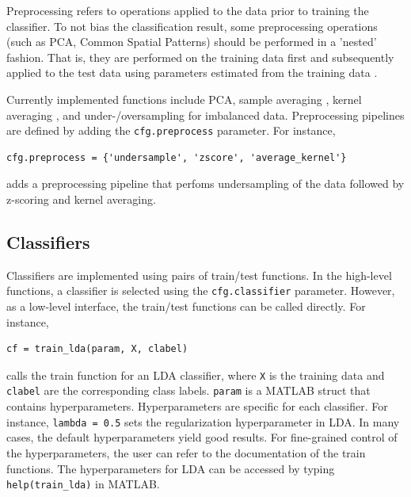 \documentclass[utf8]{frontiersSCNS} %
\newcommand{\ttt}[1]{\texttt{#1}}
\begin{document}
Preprocessing refers to operations applied to the data prior to training the classifier. To not bias the classification result, some preprocessing operations (such as PCA, Common Spatial Patterns) should be performed in a 'nested' fashion. That is, they are performed on the training data first and subsequently applied to the test data using parameters estimated from the training data \citep{Lemm2011}. 

Currently implemented functions include PCA, sample averaging \citep{Cichy2017MultivariateSpace}, kernel averaging \citep{Treder2018}, and under-/oversampling for imbalanced data. Preprocessing pipelines are defined by adding the \ttt{cfg.preprocess} parameter. For instance,

\begin{verbatim}
cfg.preprocess = {'undersample', 'zscore', 'average_kernel'}
\end{verbatim}

adds a preprocessing pipeline that perfoms undersampling of the data followed by z-scoring and kernel averaging.

\subsection{Classifiers}\label{sec:classifiers}

Classifiers are implemented using pairs of train/test functions. In the high-level functions, a classifier is selected using the \ttt{cfg.classifier} parameter. However, as a low-level interface, the train/test functions can be called directly. For instance, 

\begin{verbatim}
cf = train_lda(param, X, clabel)
\end{verbatim}

calls the train function for an LDA classifier, where \ttt{X} is the training data and \ttt{clabel} are the corresponding class labels. \ttt{param} is a MATLAB struct that contains hyperparameters. Hyperparameters are specific for each classifier. For instance, \ttt{lambda = 0.5} sets the regularization hyperparameter in LDA. In many cases, the default hyperparameters yield good results. For fine-grained control of the hyperparameters, the user can refer to the documentation of the train functions. The hyperparameters for LDA can be accessed by typing \ttt{help(train\_lda)} in MATLAB. 
\end{document}
